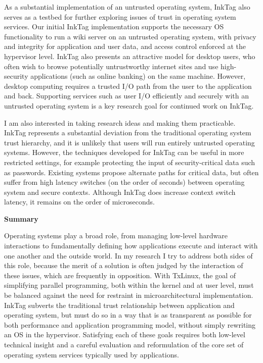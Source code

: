 \documentclass{article}
\newcommand{\inktag}{InkTag\xspace}
\begin{document}
As a substantial implementation of an untrusted operating system, \inktag
also serves as a testbed for further exploring issues of trust in operating
system services. Our initial \inktag implementation supports the necessary
OS functionality to run a wiki server on an untrusted operating system,
with privacy and integrity for application and user data, and access
control enforced at the hypervisor level. \inktag also presents an
attractive model for desktop users, who often wish to browse
potentially untrustworthy internet sites and use high-security applications
(such as online banking) on the same machine. However, desktop computing
requires a trusted I/O path from the user to the application and back.
Supporting services such as user I/O efficiently and securely with an
untrusted operating system is a key research goal for continued work on
\inktag.

I am also interested in taking research ideas and making them practicable.
\inktag represents a substantial deviation from the traditional operating
system trust hierarchy, and it is unlikely that users will run entirely
untrusted operating systems. However, the techniques developed for \inktag
can be useful in more restricted settings, for example protecting the input of
security-critical data such as passwords. Existing systems propose
alternate paths for critical data, but often suffer from high latency
switches (on the order of seconds) between operating system and secure
contexts. Although
\inktag does increase context switch latency, it remains on the order of
microseconds. 

{\bigskip \noindent \bf Summary}

\noindent Operating systems play a broad role, from managing low-level
hardware interactions to fundamentally defining how applications execute
and interact with one another and the outside world. In my research I try
to address both sides of this role, because the merit of a solution is
often judged by the interaction of these issues, which are frequently in
opposition. With TxLinux, the goal of simplifying parallel programming,
both within the kernel and at user level, must be balanced against the need
for restraint in microarchitectural implementation. \inktag subverts the
traditional trust relationship between application and operating system,
but must do so in a way that is as transparent as possible for both
performance and application programming model, without simply rewriting an
OS in the hypervisor. Satisfying each of these
goals requires both low-level technical insight and a careful evaluation
and reformulation of the core set of operating system services typically
used by applications.
\end{document}
